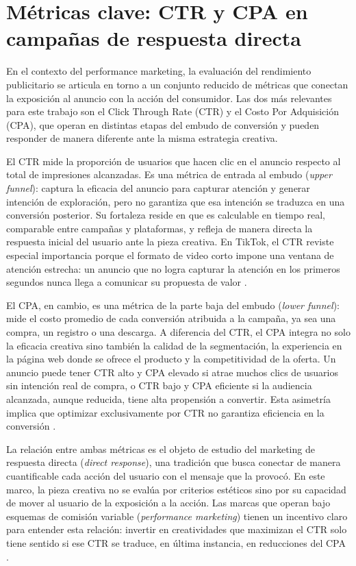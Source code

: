\documentclass[12pt, a4paper]{report}
\begin{document}
\section{Métricas clave: CTR y CPA en campañas de respuesta directa}

En el contexto del performance marketing, la evaluación del rendimiento publicitario se articula en
torno a un conjunto reducido de métricas que conectan la exposición al anuncio con la acción del
consumidor. Las dos más relevantes para este trabajo son el Click Through Rate (CTR) y el Costo Por
Adquisición (CPA), que operan en distintas etapas del embudo de conversión y pueden responder
de manera diferente ante la misma estrategia creativa.

El CTR mide la proporción de usuarios que hacen clic en el anuncio respecto al total de impresiones
alcanzadas. Es una métrica de entrada al embudo (\textit{upper funnel}): captura la eficacia del
anuncio para capturar atención y generar intención de exploración, pero no garantiza que esa intención
se traduzca en una conversión posterior. Su fortaleza reside en que es calculable en tiempo real,
comparable entre campañas y plataformas, y refleja de manera directa la respuesta inicial del usuario
ante la pieza creativa. En TikTok, el CTR reviste especial importancia porque el formato de video
corto impone una ventana de atención estrecha: un anuncio que no logra capturar la atención en los
primeros segundos nunca llega a comunicar su propuesta de valor \citep{tiktok_engagement2024}.

El CPA, en cambio, es una métrica de la parte baja del embudo (\textit{lower funnel}): mide el costo
promedio de cada conversión atribuida a la campaña, ya sea una compra, un registro o una descarga.
A diferencia del CTR, el CPA integra no solo la eficacia creativa sino también la calidad de la
segmentación, la experiencia en la página web donde se ofrece el producto y la competitividad de la oferta. Un anuncio
puede tener CTR alto y CPA elevado si atrae muchos clics de usuarios sin intención real de compra,
o CTR bajo y CPA eficiente si la audiencia alcanzada, aunque reducida, tiene alta propensión a
convertir. Esta asimetría implica que optimizar exclusivamente por CTR no garantiza eficiencia en
la conversión \citep{kantar2023}.

La relación entre ambas métricas es el objeto de estudio del marketing de respuesta directa
(\textit{direct response}), una tradición que busca conectar de manera cuantificable cada acción
del usuario con el mensaje que la provocó. En este marco, la pieza creativa no se evalúa por
criterios estéticos sino por su capacidad de mover al usuario de la exposición a la acción. Las
marcas que operan bajo esquemas de comisión variable (\textit{performance marketing}) tienen un incentivo claro para entender esta
relación: invertir en creatividades que maximizan el CTR solo tiene sentido si ese CTR se traduce,
en última instancia, en reducciones del CPA \citep{kantar2023}.
\end{document}
